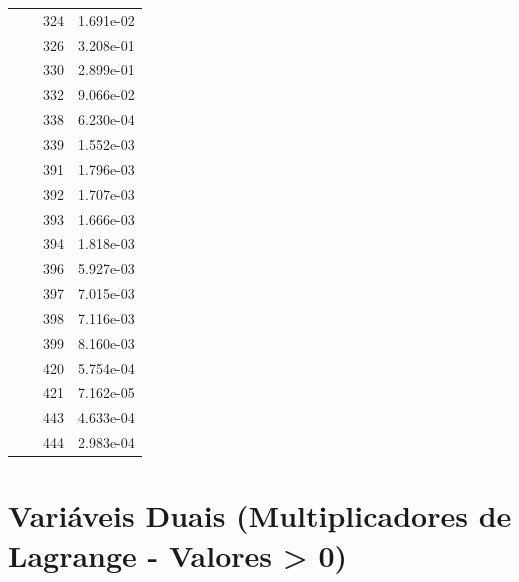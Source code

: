 \documentclass[12pt]{article}
\begin{document}
\begin{longtable}{@{}cccc@{}}
 &  & 324 & 1.691e-02 \\
 &  & 326 & 3.208e-01 \\
 &  & 330 & 2.899e-01 \\
 &  & 332 & 9.066e-02 \\
 &  & 338 & 6.230e-04 \\
 &  & 339 & 1.552e-03 \\
 &  & 391 & 1.796e-03 \\
 &  & 392 & 1.707e-03 \\
 &  & 393 & 1.666e-03 \\
 &  & 394 & 1.818e-03 \\
 &  & 396 & 5.927e-03 \\
 &  & 397 & 7.015e-03 \\
 &  & 398 & 7.116e-03 \\
 &  & 399 & 8.160e-03 \\
 &  & 420 & 5.754e-04 \\
 &  & 421 & 7.162e-05 \\
 &  & 443 & 4.633e-04 \\
 &  & 444 & 2.983e-04 \\

\bottomrule
\end{longtable}


\section{Variáveis Duais (Multiplicadores de Lagrange - Valores > 0)}
\end{document}
